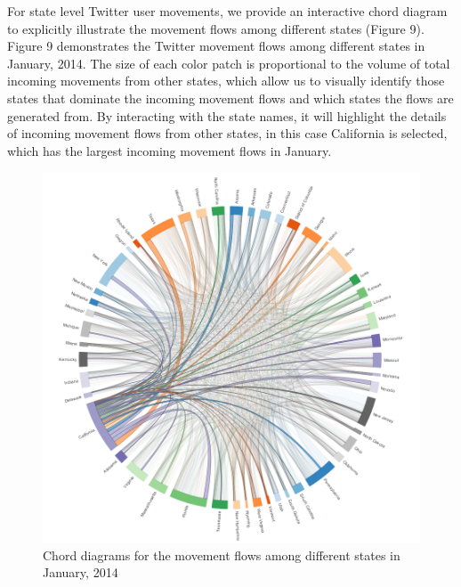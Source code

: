 \documentclass[a4paper, 11pt]{article}
\begin{document}
For state level Twitter user movements, we provide an interactive chord diagram to explicitly illustrate the movement flows among different states (Figure 9). Figure 9 demonstrates the Twitter movement flows among different states in January, 2014. The size of each color patch is proportional to the volume of total incoming movements from other states, which allow us to visually identify those states that dominate the incoming movement flows and which states the flows are generated from.
By interacting with the state names, it will highlight the details of incoming movement flows from other states, in this case California is selected, which has the largest incoming movement flows in January.\newline

\begin{figure}[h]
\centering
\includegraphics[width=1.0\linewidth]{./figures/vaca_flow}
\caption{Chord diagrams for the movement flows among different states in January, 2014}
\label{fig:vaca_movement}
\end{figure}
\FloatBarrier


\end{document}

